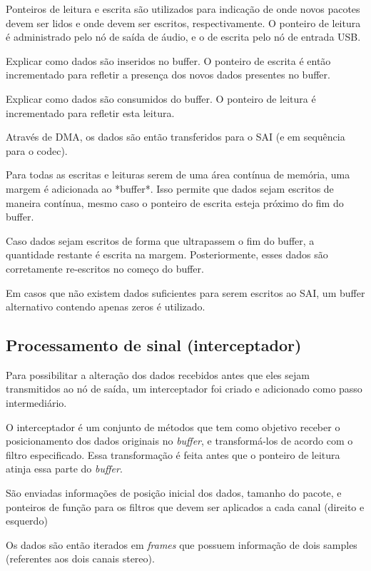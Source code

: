 Ponteiros de leitura e escrita são utilizados para indicação de onde novos pacotes devem ser lidos e onde devem ser escritos, respectivamente. O ponteiro de leitura é administrado pelo nó de saída de áudio, e o de escrita pelo nó de entrada USB.

\color{orange}

Explicar como dados são inseridos no buffer. O ponteiro de escrita é então incrementado para refletir a presença dos novos dados presentes no buffer.

Explicar como dados são consumidos do buffer. O ponteiro de leitura é incrementado para refletir esta leitura.
\color{black}

Através de DMA, os dados são então transferidos para o SAI (e em sequência para o codec).

Para todas as escritas e leituras serem de uma área contínua de memória, uma margem é adicionada ao *buffer*. Isso permite que dados sejam escritos de maneira contínua, mesmo caso o ponteiro de escrita esteja próximo do fim do buffer.

Caso dados sejam escritos de forma que ultrapassem o fim do buffer, a quantidade restante é escrita na margem. Posteriormente, esses dados são corretamente re-escritos no começo do buffer. 

Em casos que não existem dados suficientes para serem escritos ao SAI, um buffer alternativo contendo apenas zeros é utilizado.


\subsection{Processamento de sinal (interceptador)}
Para possibilitar a alteração dos dados recebidos antes que eles sejam transmitidos ao nó de saída, um interceptador foi criado e adicionado como passo intermediário.

O interceptador é um conjunto de métodos que tem como objetivo receber o posicionamento dos dados originais no \textit{buffer}, e transformá-los de acordo com o filtro especificado. Essa transformação é feita antes que o ponteiro de leitura atinja essa parte do \textit{buffer}.

São enviadas informações de posição inicial dos dados, tamanho do pacote, e ponteiros de função para os filtros que devem ser aplicados a cada canal (direito e esquerdo)

Os dados são então iterados em \textit{frames} que possuem informação de dois samples (referentes aos dois canais stereo).

